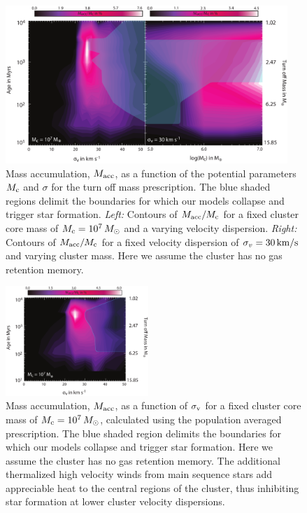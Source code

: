 \documentclass[fleqn,usenatbib]{mnras}
\begin{document}
\begin{figure}
\centering\includegraphics[width=0.95\textwidth]{fig_mto_contours.pdf}
\caption{Mass accumulation, $M_{\rm acc}$, as a function of the potential parameters $M_{\rm c}$ and $\sigma$ for the 
turn off mass prescription.   The blue shaded regions delimit the boundaries for which our models collapse and trigger star formation.
{\textit{Left:}} Contours of $M_{\rm acc}/M_{\rm c}$ for a fixed cluster core 
mass of $M_{\rm c} = 10^7 \, M_\odot$ and a varying velocity dispersion. 
 {\textit{Right:}} Contours 
of $M_{\rm acc}/M_{\rm c}$ for a fixed velocity dispersion of $\sigma_v = 30 \, {\rm km/s}$ and 
varying cluster mass.  Here we assume the cluster has no gas retention memory.}
\label{fig:fig4}
\end{figure} 


\begin{figure}
\centering\includegraphics[width=0.48\textwidth]{fig5_newTime.pdf}
\caption{Mass accumulation, $M_{\rm acc}$, as a function of  $\sigma_{\rm v}$ for a fixed cluster core 
mass of $M_{\rm c} = 10^7 \, M_\odot$, calculated using  the population averaged 
prescription.  The blue shaded region delimits the boundaries for which our models collapse and trigger star formation. Here we assume the cluster has no gas retention memory.  The additional thermalized high velocity winds from main sequence stars add appreciable heat to the central regions of the cluster, thus inhibiting star formation at lower cluster velocity dispersions.}
\label{fig:fig5}
\end{figure} 
\end{document}

